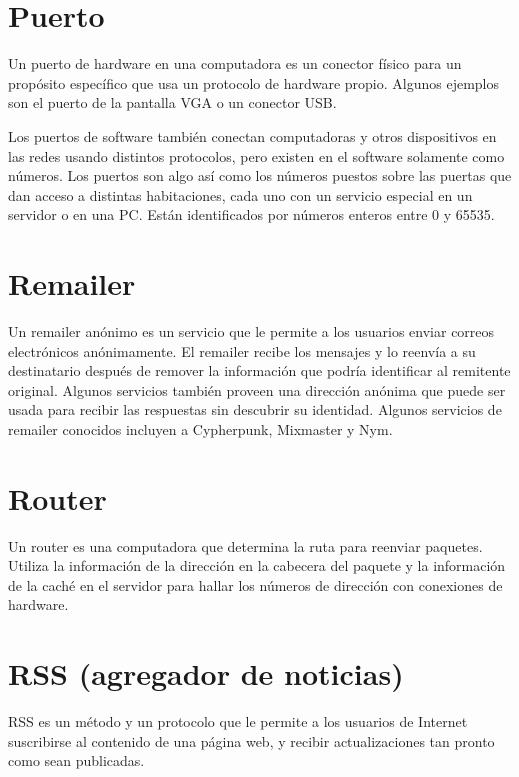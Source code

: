 \documentclass[10pt,a5paper,twoside,,]{book}
\begin{document}
\section{Puerto}\label{puerto}

Un puerto de hardware en una computadora es un conector físico para un
propósito específico que usa un protocolo de hardware propio. Algunos
ejemplos son el puerto de la pantalla VGA o un conector USB.

Los puertos de software también conectan computadoras y otros
dispositivos en las redes usando distintos protocolos, pero existen en
el software solamente como números. Los puertos son algo así como los
números puestos sobre las puertas que dan acceso a distintas
habitaciones, cada uno con un servicio especial en un servidor o en una
PC. Están identificados por números enteros entre 0 y 65535.

\section{Remailer}\label{remailer}

Un remailer anónimo es un servicio que le permite a los usuarios enviar
correos electrónicos anónimamente. El remailer recibe los mensajes y lo
reenvía a su destinatario después de remover la información que podría
identificar al remitente original. Algunos servicios también proveen una
dirección anónima que puede ser usada para recibir las respuestas sin
descubrir su identidad. Algunos servicios de remailer conocidos incluyen
a Cypherpunk, Mixmaster y Nym.

\section{Router}\label{router}

Un router es una computadora que determina la ruta para reenviar
paquetes. Utiliza la información de la dirección en la cabecera del
paquete y la información de la caché en el servidor para hallar los
números de dirección con conexiones de hardware.

\section{RSS (agregador de noticias)}\label{rss-agregador-de-noticias}

RSS es un método y un protocolo que le permite a los usuarios de
Internet suscribirse al contenido de una página web, y recibir
actualizaciones tan pronto como sean publicadas.
\end{document}

